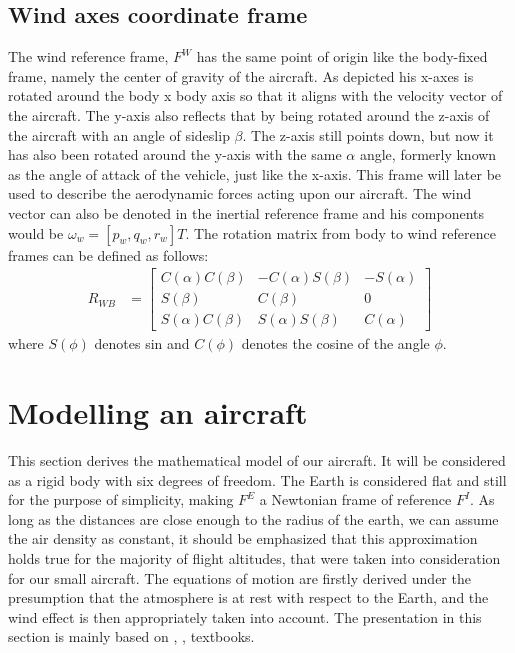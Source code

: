 \documentclass[twocolumn,showpacs,
    nofootinbib,aps,superscriptaddress,
    eqsecnum,prd,showkeys,10pt,floatfix]{revtex4}
\begin{document}
\subsection{Wind axes coordinate frame}
The wind reference frame, $F^W$ has the same point of origin like the
body-fixed frame, namely the center of gravity of the aircraft. As depicted his
x-axes is rotated around the body x body axis so that it aligns with the
velocity vector of the aircraft. The y-axis also reflects that by being rotated
around the z-axis of the aircraft with an angle of sideslip $\beta$. The z-axis
still points down, but now it has also been rotated around the y-axis with the
same $\alpha$ angle, formerly known as the angle of attack of the vehicle, just
like the x-axis. This frame will later be used to describe the aerodynamic
forces acting upon our aircraft. The wind vector can also be denoted in the
inertial reference frame and his components would be $\omega_{w}={[p_w, q_w,
            r_w]}T$. The rotation matrix from body to wind reference frames can be defined
as follows:
\begin{align}
    R_{WB} & =\begin{bmatrix}
                  C(\alpha)C(\beta) & -C(\alpha)S(\beta) & -S(\alpha) \\
                  S(\beta)          & C(\beta)           & 0          \\
                  S(\alpha)C(\beta) & S(\alpha)S(\beta)  & C(\alpha)
              \end{bmatrix}
    \label{WindToBodyRotationMatrix}
\end{align}
where $S(\phi)$ denotes sin and $C(\phi)$ denotes the cosine of the angle $\phi$.


\section{Modelling an aircraft}
This section derives the mathematical model of our aircraft. It will be
considered as a rigid body with six degrees of freedom. The Earth is considered
flat and still for the purpose of simplicity, making $F^E$ a Newtonian frame of
reference $F^I$. As long as the distances are close enough to the radius of the
earth, we can assume the air density as constant, it should be emphasized that
this approximation holds true for the majority of flight altitudes, that were
taken into consideration for our small aircraft. The equations of motion are
firstly derived under the presumption that the atmosphere is at rest with
respect to the Earth, and the wind effect is then appropriately taken into
account. The presentation in this section is mainly based on
    {\cite{Aircraft_Control_and_Simulation}},
{\cite{Dynamics_of_Atmospheric_Flight}},
{\cite{Field_Path_Following_for_Miniature_Air_vehicles}} textbooks.
\end{document}
